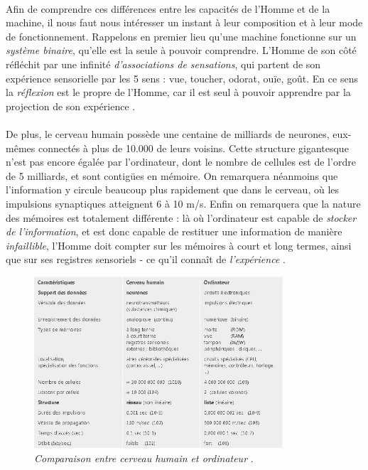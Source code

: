 \paragraph{} Afin de comprendre ces différences entre les capacités de l'Homme et de la machine, il nous faut nous
intéresser un instant à leur composition et à leur mode de fonctionnement. Rappelons en premier lieu qu'une machine
fonctionne sur un \emph{système binaire}, qu'elle est la seule à pouvoir comprendre. L'Homme de son côté réfléchit
par une infinité \emph{d'associations de sensations}, qui partent de son expérience sensorielle par les 5 sens : vue,
toucher, odorat, ouïe, goût. En ce sens la \emph{réflexion} est le propre de l'Homme, car il est seul à pouvoir 
apprendre par la projection de son expérience \cite{Brain1}.

\paragraph{} De plus, le cerveau humain possède une centaine de milliards de neurones, eux-mêmes connectés à plus de 10.000
de leurs voisins. Cette structure gigantesque n'est pas encore égalée par l'ordinateur, dont le nombre de cellules est de
l'ordre de 5 milliards, et sont contigües en mémoire. On remarquera néanmoins que l'information y circule
beaucoup plus rapidement que dans le cerveau, où les impulsions synaptiques atteignent 6 à 10 m/s. Enfin on remarquera que la
nature des mémoires est totalement différente : là où l'ordinateur est capable de \emph{stocker de l'information}, et est donc
capable de restituer une information de manière \emph{infaillible}, l'Homme doit compter sur les mémoires à court et long termes,
ainsi que sur ses registres sensoriels - ce qu'il connaît de \emph{l'expérience} \cite{Brain0}.

\begin{figure}[ht]
    \centering
    \includegraphics[width=350px]{chapters/03/images/cerveau-robot.jpg}
    \caption{\label{comparatif}\emph{Comparaison entre cerveau humain et ordinateur} \cite{Brain1}.}
\end{figure}



